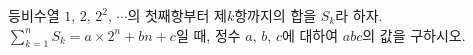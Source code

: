 등비수열 $1$, $2$, $2^2$, $\cdots$의 첫째항부터 제$k$항까지의 합을 $S_k$라 하자. $\displaystyle\sum_{k=1}^{n} S_k=a\times 2^n+bn+c$일 때, 정수 $a$, $b$, $c$에 대하여 $abc$의 값을 구하시오.
